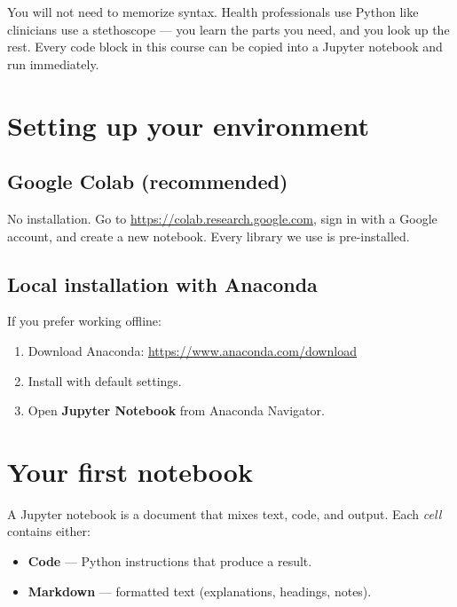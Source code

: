 \begin{clinicalnote}
You will not need to memorize syntax. Health professionals use Python like clinicians use a stethoscope --- you learn the parts you need, and you look up the rest. Every code block in this course can be copied into a Jupyter notebook and run immediately.
\end{clinicalnote}

\section{Setting up your environment}

\subsection{Google Colab (recommended)}

No installation. Go to \url{https://colab.research.google.com}, sign in with a Google account, and create a new notebook. Every library we use is pre-installed.

\subsection{Local installation with Anaconda}

If you prefer working offline:
\begin{enumerate}
  \item Download Anaconda: \url{https://www.anaconda.com/download}
  \item Install with default settings.
  \item Open \textbf{Jupyter Notebook} from Anaconda Navigator.
\end{enumerate}

\section{Your first notebook}

A Jupyter notebook is a document that mixes text, code, and output. Each \emph{cell} contains either:
\begin{itemize}
  \item \textbf{Code} --- Python instructions that produce a result.
  \item \textbf{Markdown} --- formatted text (explanations, headings, notes).
\end{itemize}

